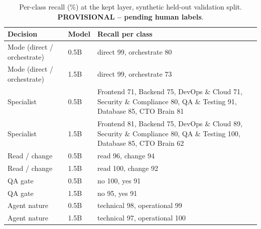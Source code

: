 \begin{table}[t]\centering\scriptsize
\caption{Per-class recall (\%) at the kept layer, synthetic held-out validation split. \textbf{PROVISIONAL -- pending human labels}.}
\label{tab:recall}\setlength{\tabcolsep}{3pt}
\begin{tabular}{l l p{4.6cm}}\toprule Decision & Model & Recall per class\\\midrule
Mode (direct / orchestrate) & 0.5B & direct 99, orchestrate 80 \\
Mode (direct / orchestrate) & 1.5B & direct 99, orchestrate 73 \\
Specialist & 0.5B & Frontend 71, Backend 75, DevOps \& Cloud 71, Security \& Compliance 80, QA \& Testing 91, Database 85, CTO Brain 81 \\
Specialist & 1.5B & Frontend 81, Backend 75, DevOps \& Cloud 89, Security \& Compliance 80, QA \& Testing 100, Database 85, CTO Brain 62 \\
Read / change & 0.5B & read 96, change 94 \\
Read / change & 1.5B & read 100, change 92 \\
QA gate & 0.5B & no 100, yes 91 \\
QA gate & 1.5B & no 95, yes 91 \\
Agent nature & 0.5B & technical 98, operational 99 \\
Agent nature & 1.5B & technical 97, operational 100 \\
\bottomrule\end{tabular}\end{table}
